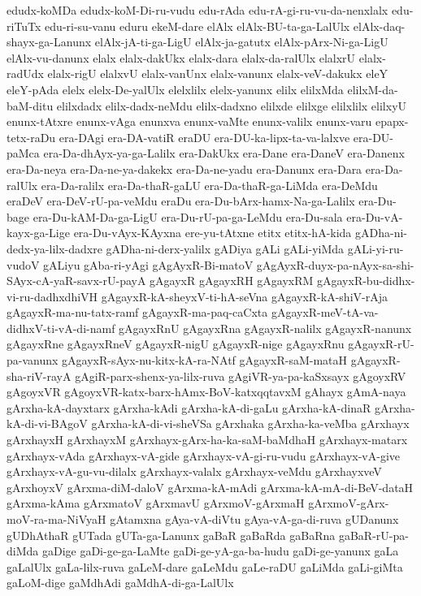 {edudx-koMDa
edudx-koM-Di-ru-vudu
edu-rAda
edu-rA-gi-ru-vu-da-nenxlalx
edu-riTuTx
edu-ri-su-vanu
eduru
ekeM-dare
elAlx
elAlx-BU-ta-ga-LalUlx
elAlx-daq-shayx-ga-Lanunx
elAlx-jA-ti-ga-LigU
elAlx-ja-gatutx
elAlx-pArx-Ni-ga-LigU
elAlx-vu-danunx
elalx
elalx-dakUkx
elalx-dara
elalx-da-ralUlx
elalxrU
elalx-radUdx
elalx-rigU
elalxvU
elalx-vanUnx
elalx-vanunx
elalx-veV-dakukx
eleY
eleY-pAda
elelx
elelx-De-yalUlx
elelxlilx
elelx-yanunx
elilx
elilxMda
elilxM-da-baM-ditu
elilxdadx
elilx-dadx-neMdu
elilx-dadxno
elilxde
elilxge
elilxlilx
elilxyU
enunx-tAtxre
enunx-vAga
enunxva
enunx-vaMte
enunx-valilx
enunx-varu
epapx-tetx-raDu
era-DAgi
era-DA-vatiR
eraDU
era-DU-ka-lipx-ta-va-lalxve
era-DU-paMca
era-Da-dhAyx-ya-ga-Lalilx
era-DakUkx
era-Dane
era-DaneV
era-Danenx
era-Da-neya
era-Da-ne-ya-dakekx
era-Da-ne-yadu
era-Danunx
era-Dara
era-Da-ralUlx
era-Da-ralilx
era-Da-thaR-gaLU
era-Da-thaR-ga-LiMda
era-DeMdu
eraDeV
era-DeV-rU-pa-veMdu
eraDu
era-Du-bArx-hamx-Na-ga-Lalilx
era-Du-bage
era-Du-kAM-Da-ga-LigU
era-Du-rU-pa-ga-LeMdu
era-Du-sala
era-Du-vA-kayx-ga-Lige
era-Du-vAyx-KAyxna
ere-yu-tAtxne
etitx
etitx-hA-kida
gADha-ni-dedx-ya-lilx-dadxre
gADha-ni-derx-yalilx
gADiya
gALi
gALi-yiMda
gALi-yi-ru-vudoV
gALiyu
gAba-ri-yAgi
gAgAyxR-Bi-matoV
gAgAyxR-duyx-pa-nAyx-sa-shi-SAyx-cA-yaR-savx-rU-payA
gAgayxR
gAgayxRH
gAgayxRM
gAgayxR-bu-didhx-vi-ru-dadhxdhiVH
gAgayxR-kA-sheyxV-ti-hA-seVna
gAgayxR-kA-shiV-rAja
gAgayxR-ma-nu-tatx-ramf
gAgayxR-ma-paq-caCxta
gAgayxR-meV-tA-va-didhxV-ti-vA-di-namf
gAgayxRnU
gAgayxRna
gAgayxR-nalilx
gAgayxR-nanunx
gAgayxRne
gAgayxRneV
gAgayxR-nigU
gAgayxR-nige
gAgayxRnu
gAgayxR-rU-pa-vanunx
gAgayxR-sAyx-nu-kitx-kA-ra-NAtf
gAgayxR-saM-mataH
gAgayxR-sha-riV-rayA
gAgiR-parx-shenx-ya-lilx-ruva
gAgiVR-ya-pa-kaSxsayx
gAgoyxRV
gAgoyxVR
gAgoyxVR-katx-barx-hAmx-BoV-katxqqtavxM
gAhayx
gAmA-naya
gArxha-kA-dayxtarx
gArxha-kAdi
gArxha-kA-di-gaLu
gArxha-kA-dinaR
gArxha-kA-di-vi-BAgoV
gArxha-kA-di-vi-sheVSa
gArxhaka
gArxha-ka-veMba
gArxhayx
gArxhayxH
gArxhayxM
gArxhayx-gArx-ha-ka-saM-baMdhaH
gArxhayx-matarx
gArxhayx-vAda
gArxhayx-vA-gide
gArxhayx-vA-gi-ru-vudu
gArxhayx-vA-give
gArxhayx-vA-gu-vu-dilalx
gArxhayx-valalx
gArxhayx-veMdu
gArxhayxveV
gArxhoyxV
gArxma-diM-daloV
gArxma-kA-mAdi
gArxma-kA-mA-di-BeV-dataH
gArxma-kAma
gArxmatoV
gArxmavU
gArxmoV-gArxmaH
gArxmoV-gArx-moV-ra-ma-NiVyaH
gAtamxna
gAya-vA-diVtu
gAya-vA-ga-di-ruva
gUDanunx
gUDhAthaR
gUTada
gUTa-ga-Lanunx
gaBaR
gaBaRda
gaBaRna
gaBaR-rU-pa-diMda
gaDige
gaDi-ge-ga-LaMte
gaDi-ge-yA-ga-ba-hudu
gaDi-ge-yanunx
gaLa
gaLalUlx
gaLa-lilx-ruva
gaLeM-dare
gaLeMdu
gaLe-raDU
gaLiMda
gaLi-giMta
gaLoM-dige
gaMdhAdi
gaMdhA-di-ga-LalUlx
}
